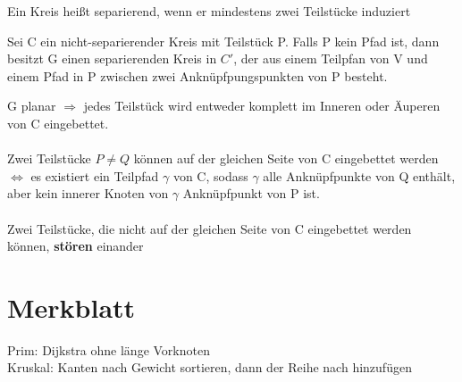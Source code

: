 \documentclass[14pt]{article}
\begin{document}
\begin{definition}
    Ein Kreis heißt separierend, wenn er mindestens zwei
    Teilstücke induziert
\end{definition}
\begin{eigenschaft}
    Sei C ein nicht-separierender Kreis mit Teilstück P.
    Falls P kein Pfad ist, dann besitzt G einen separierenden Kreis
    in $C'$, der aus einem Teilpfan von V und einem Pfad in P 
    zwischen zwei Anknüpfpungspunkten von P besteht.
\end{eigenschaft}
\begin{definition}
    G planar $\Rightarrow$ jedes Teilstück wird entweder komplett im Inneren oder
    Äuperen von C eingebettet. \\
    \\
    Zwei Teilstücke $P \neq Q$ können auf der gleichen Seite von C 
    eingebettet werden $\Leftrightarrow$ es existiert ein Teilpfad $\gamma$ von C,
    sodass $\gamma$ alle Anknüpfpunkte von Q enthält, aber kein innerer 
    Knoten von $\gamma$ Anknüpfpunkt von P ist. \\
    \\
    Zwei Teilstücke, die nicht auf der gleichen Seite von C
    eingebettet werden können, \textbf{stören} einander
\end{definition}
\section{Merkblatt}
Prim: Dijkstra ohne länge Vorknoten \\
Kruskal: Kanten nach Gewicht sortieren, dann der Reihe
nach hinzufügen 
\end{document}
